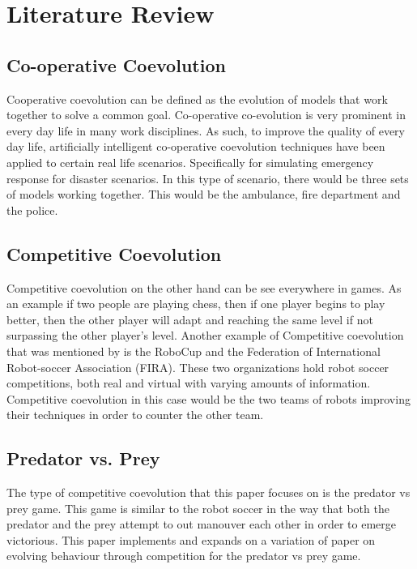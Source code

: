 \section{Literature Review}

\subsection{Co-operative Coevolution}
 Cooperative coevolution can be defined as the evolution of models that work together to solve a common goal. Co-operative co-evolution is very prominent in every day life in many work disciplines. As such, to improve the quality of every day life, artificially intelligent co-operative coevolution techniques have been applied to certain real life scenarios. Specifically for simulating emergency response for disaster scenarios. In this type of scenario, there would be three sets of models working together. This would be the ambulance, fire department and the police.

\subsection{Competitive Coevolution}
  Competitive coevolution on the other hand can be see everywhere in games. As an example if two people are playing chess, then if one player begins to play better, then the other player will adapt and reaching the same level if not surpassing the other player's level. Another example of Competitive coevolution that was mentioned by \cite{Scheepers-2013} is the RoboCup and the Federation of International Robot-soccer Association (FIRA). These two organizations hold robot soccer competitions, both real and virtual with varying amounts of information. Competitive coevolution in this case would be the two teams of robots improving their techniques in order to counter the other team. 

\subsection{Predator vs. Prey}
The type of competitive coevolution that this paper focuses on is the predator vs prey game. This game is similar to the robot soccer in the way that both the predator and the prey attempt to out manouver each other in order to emerge victorious. This paper implements and expands on a variation of \cite{Langenhoven-2006} paper on evolving behaviour through competition for the predator vs prey game.